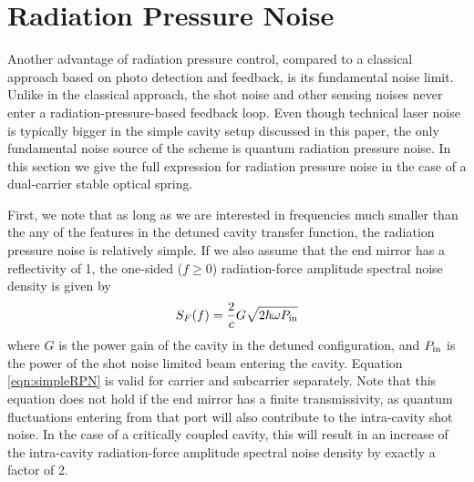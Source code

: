\section{Radiation Pressure Noise}
\label{sec:V}
Another advantage of radiation pressure control, compared to a classical approach based on photo detection and feedback, is its fundamental noise limit. Unlike in the classical approach, the shot noise and other sensing noises %
never enter a radiation-pressure-based feedback loop. Even though technical laser noise is typically bigger in the simple cavity setup discussed in this paper, the only fundamental noise source of the scheme is quantum radiation pressure noise. In this section we give the full expression for radiation pressure noise in the case of a dual-carrier stable optical spring.

First, we note that as long as we are interested in frequencies much smaller than the any of the features in the detuned cavity transfer function, the radiation pressure noise is relatively simple. If we also assume that the end mirror has a reflectivity of 1, the one-sided ($f\ge0$) radiation-force amplitude spectral noise density is given by
\begin{eqnarray}
\label{eqn:simpleRPN}
S_F (f) = \frac{2}{c} G \sqrt{2 \hbar \omega P_{\rm in}}
\end{eqnarray}
where $G$ is the power gain of the cavity in the detuned configuration, and $P_{\rm in}$ is the power of the shot noise limited beam entering the cavity.
Equation \ref{eqn:simpleRPN} is valid for carrier and subcarrier separately.
Note that this equation does not hold if the end mirror has a finite transmissivity, as quantum fluctuations entering from that port will also contribute to the intra-cavity shot noise. In the case of a critically coupled cavity, this will result in an increase of the intra-cavity radiation-force amplitude spectral noise density by exactly a factor of 2.

